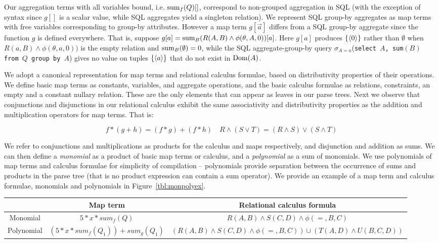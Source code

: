 Our aggregation terms with all variables bound, i.e. $\mathrm{sum}_{f}(Q)[]$,
correspond to non-grouped aggregation in SQL (with the exception of syntax since
$g[]$ is a scalar value, while SQL aggregates yield a singleton relation).  We
represent SQL group-by aggregates as map terms with free variables corresponding
to group-by attributes. However a map term $g[\vec{a}]$
differs from a SQL group-by aggregate since the function $g$ is defined everywhere.
That is, suppose $g[a] = \mathrm{sum}_{B}(R(A,B) \wedge \phi(\theta,A,0))[a]$. Here $g[a]$
produces $\{{\langle0\rangle}\}$ rather than $\emptyset$ when
$R(a,B) \wedge \phi(\theta,a,0))$ is the empty relation and
$\mathrm{sum}_{B}(\emptyset) = 0$, while the SQL aggregate-group-by query
$\sigma_{A=a}$(\texttt{select $A$, sum$(B)$ from $Q$ group by $A$})
gives no value on tuples $\{{\langle a\rangle}\}$ that do not exist in $\mathrm{Dom}(A)$.


We adopt a canonical representation for map terms and relational calculus
formulae, based on distributivity properties of their operations. We define
basic map terms as constants, variables, and aggregate operations, and the basic
calculus formulae as relations, constraints, an empty and a constant
nullary relation. These are the only elements that can appear as leaves in our
parse trees. Next we observe that conjunctions and disjunctions in our relational
calculus exhibit the same associativity and distributivity properties as the
addition and multiplication operators for map terms. That is:

\[
f*(g+h) = (f*g) + (f*h)
\quad
R \wedge(S \vee T) = (R \wedge S) \vee (S \wedge T)
\]


We refer to conjunctions and multiplications as products for the calculus and
maps respectively, and disjunction and addition as sums.  We can then define a
\textit{monomial} as a product of basic map terms or calculus, and a
\textit{polynomial} as a sum of monomials. We use polynomials of map terms and
calculus formulae for simplicity of compilation -- polynomials provide
separation between the occurrence of sums and products in the parse tree (that
is no product expression can contain a sum operator).  We provide an example of
a map term and calculus formulae, monomials and polynomials in
Figure~\ref{tbl:monpolyex}.

\begin{figure*}[htbp]
\begin{center}
\begin{tabular}{c|c|c}
           & Map term & Relational calculus formula\\
\hline
Monomial   & $5*x*sum_{f}(Q)$
           & $R(A,B) \wedge S(C,D) \wedge \phi(=,B,C)$\\
Polynomial & $(5*x*sum_{f}(Q_1)) + sum_g(Q_1) $
           & $(R(A,B) \wedge S(C,D) \wedge \phi(=,B,C)) \cup (T(A,D) \wedge U(B,C,D))$
\end{tabular}
\label{tbl:monpolyex}
\caption{Map term and relational calculus, monomial and polynomial examples.}
\end{center}
\end{figure*}

